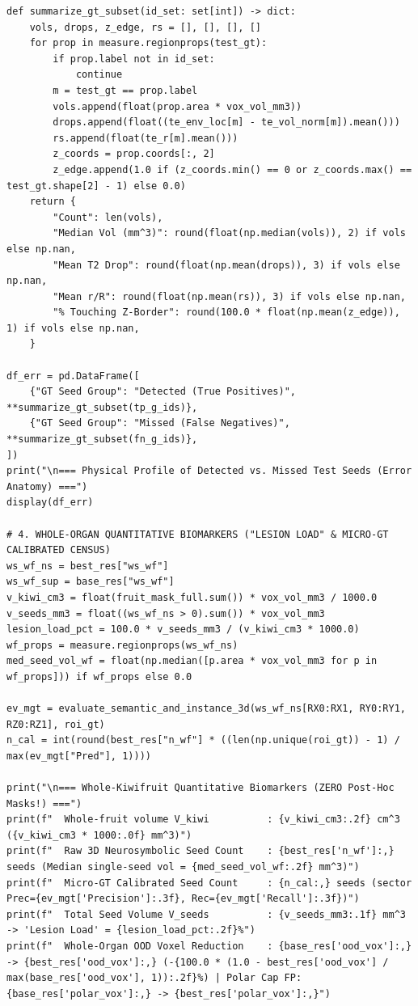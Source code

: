 \documentclass[10pt,a4paper]{article}
\begin{document}
\begin{codebox}
\begin{lstlisting}[style=pybmed]
def summarize_gt_subset(id_set: set[int]) -> dict:
    vols, drops, z_edge, rs = [], [], [], []
    for prop in measure.regionprops(test_gt):
        if prop.label not in id_set:
            continue
        m = test_gt == prop.label
        vols.append(float(prop.area * vox_vol_mm3))
        drops.append(float((te_env_loc[m] - te_vol_norm[m]).mean()))
        rs.append(float(te_r[m].mean()))
        z_coords = prop.coords[:, 2]
        z_edge.append(1.0 if (z_coords.min() == 0 or z_coords.max() == test_gt.shape[2] - 1) else 0.0)
    return {
        "Count": len(vols),
        "Median Vol (mm^3)": round(float(np.median(vols)), 2) if vols else np.nan,
        "Mean T2 Drop": round(float(np.mean(drops)), 3) if vols else np.nan,
        "Mean r/R": round(float(np.mean(rs)), 3) if vols else np.nan,
        "% Touching Z-Border": round(100.0 * float(np.mean(z_edge)), 1) if vols else np.nan,
    }

df_err = pd.DataFrame([
    {"GT Seed Group": "Detected (True Positives)", **summarize_gt_subset(tp_g_ids)},
    {"GT Seed Group": "Missed (False Negatives)",  **summarize_gt_subset(fn_g_ids)},
])
print("\n=== Physical Profile of Detected vs. Missed Test Seeds (Error Anatomy) ===")
display(df_err)

# 4. WHOLE-ORGAN QUANTITATIVE BIOMARKERS ("LESION LOAD" & MICRO-GT CALIBRATED CENSUS)
ws_wf_ns = best_res["ws_wf"]
ws_wf_sup = base_res["ws_wf"]
v_kiwi_cm3 = float(fruit_mask_full.sum()) * vox_vol_mm3 / 1000.0
v_seeds_mm3 = float((ws_wf_ns > 0).sum()) * vox_vol_mm3
lesion_load_pct = 100.0 * v_seeds_mm3 / (v_kiwi_cm3 * 1000.0)
wf_props = measure.regionprops(ws_wf_ns)
med_seed_vol_wf = float(np.median([p.area * vox_vol_mm3 for p in wf_props])) if wf_props else 0.0

ev_mgt = evaluate_semantic_and_instance_3d(ws_wf_ns[RX0:RX1, RY0:RY1, RZ0:RZ1], roi_gt)
n_cal = int(round(best_res["n_wf"] * ((len(np.unique(roi_gt)) - 1) / max(ev_mgt["Pred"], 1))))

print("\n=== Whole-Kiwifruit Quantitative Biomarkers (ZERO Post-Hoc Masks!) ===")
print(f"  Whole-fruit volume V_kiwi          : {v_kiwi_cm3:.2f} cm^3 ({v_kiwi_cm3 * 1000:.0f} mm^3)")
print(f"  Raw 3D Neurosymbolic Seed Count    : {best_res['n_wf']:,} seeds (Median single-seed vol = {med_seed_vol_wf:.2f} mm^3)")
print(f"  Micro-GT Calibrated Seed Count     : {n_cal:,} seeds (sector Prec={ev_mgt['Precision']:.3f}, Rec={ev_mgt['Recall']:.3f})")
print(f"  Total Seed Volume V_seeds          : {v_seeds_mm3:.1f} mm^3 -> 'Lesion Load' = {lesion_load_pct:.2f}%")
print(f"  Whole-Organ OOD Voxel Reduction    : {base_res['ood_vox']:,} -> {best_res['ood_vox']:,} (-{100.0 * (1.0 - best_res['ood_vox'] / max(base_res['ood_vox'], 1)):.2f}%) | Polar Cap FP: {base_res['polar_vox']:,} -> {best_res['polar_vox']:,}")


\end{lstlisting}
\end{codebox}
\end{document}
